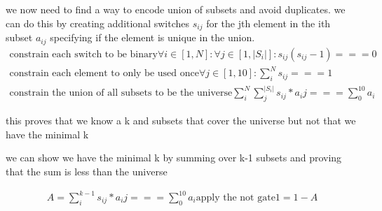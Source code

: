 \documentclass{article}
\begin{document}
\begin{enumerate}
     we now need to find a way to encode union of subsets and avoid duplicates.
     we can do this by creating additional switches $s_{ij}$ for the jth element in the ith subset $a_{ij}$ specifying if the element is unique in the union.
     \begin{align*}
          \text{constrain each switch to be binary}
          \forall i \in [1, N]: \forall j \in [1, |S_i|]: s_{ij}(s_{ij}-1) === 0 \\
          \text{constrain each element to only be used once}
          \forall j \in [1, 10]: \sum_{i}^{N} s_{ij} === 1 \\
          \text{constrain the union of all subsets to be the universe}
          \sum_{i}^{N} \sum_{j}^{|S_i|} s_{ij}*a_ij === \sum_{0}^{10} a_i
     \end{align*}

     this proves that we know a k and subsets that cover the universe but not that we have the minimal k

     we can show we have the minimal k by summing over k-1 subsets and proving that the sum is less than the universe

     \begin{align*}
          A = \sum_{i}^{k-1} s_{ij}*a_ij === \sum_{0}^{10} a_i
          \text{apply the not gate}
          1 = 1 - A
     \end{align*}





\end{enumerate}
\end{document}
